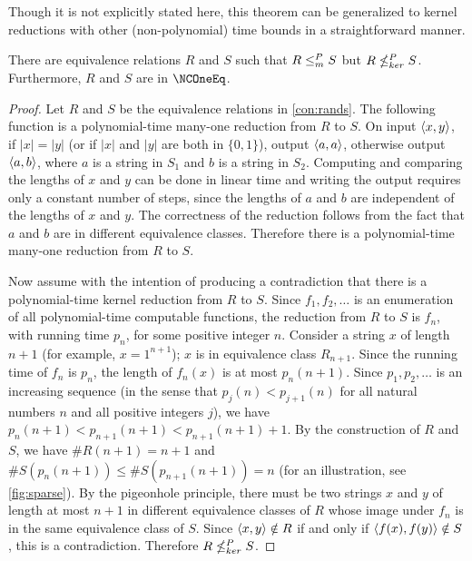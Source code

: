 Though it is not explicitly stated here, this theorem can be generalized to kernel reductions with other (non-polynomial) time bounds in a straightforward manner.

\begin{theorem}\label{thm:different}
  There are equivalence relations $R$ and $S$ such that $R \leq^{P}_{m} S$ but $R \nleq^{P}_{ker} S$.
  Furthermore, $R$ and $S$ are in $\NCOneEq$.
\end{theorem}
\begin{proof}
  Let $R$ and $S$ be the equivalence relations in \autoref{con:rands}.
  The following function is a polynomial-time many-one reduction from $R$ to $S$.
  On input $\langle x,y\rangle$, if $|x| = |y|$ (or if $|x|$ and $|y|$ are both in $\{0, 1\}$), output $\langle a,a\rangle$, otherwise output $\langle a,b\rangle$, where $a$ is a string in $S_1$ and $b$ is a string in $S_2$.
  Computing and comparing the lengths of $x$ and $y$ can be done in linear time and writing the output requires only a constant number of steps, since the lengths of $a$ and $b$ are independent of the lengths of $x$ and $y$.
  The correctness of the reduction follows from the fact that $a$ and $b$ are in different equivalence classes.
  Therefore there is a polynomial-time many-one reduction from $R$ to $S$.

  Now assume with the intention of producing a contradiction that there is a polynomial-time kernel reduction from $R$ to $S$.
  Since $f_1, f_2, \dotsc$ is an enumeration of all polynomial-time computable functions, the reduction from $R$ to $S$ is $f_n$, with running time $p_n$, for some positive integer $n$.
  Consider a string $x$ of length $n + 1$ (for example, $x = 1^{n + 1}$); $x$ is in equivalence class $R_{n + 1}$.
  Since the running time of $f_n$ is $p_n$, the length of $f_n(x)$ is at most $p_n(n + 1)$.
  Since $p_1, p_2, \dotsc$ is an increasing sequence (in the sense that $p_j(n) < p_{j + 1}(n)$ for all natural numbers $n$ and all positive integers $j$), we have $p_n(n + 1) < p_{n + 1}(n + 1) < p_{n + 1}(n + 1) + 1$.
  By the construction of $R$ and $S$, we have $\#R(n + 1) = n + 1$ and $\#S(p_n(n + 1)) \leq \#S(p_{n + 1}(n + 1)) = n$ (for an illustration, see \autoref{fig:sparse}).
  By the pigeonhole principle, there must be two strings $x$ and $y$ of length at most $n + 1$ in different equivalence classes of $R$ whose image under $f_n$ is in the same equivalence class of $S$.
  Since $\langle x,y\rangle \notin R$ if and only if $\langle f(x),f(y)\rangle \notin S$, this is a contradiction.
  Therefore $R \nleq^{P}_{ker} S$.


\end{proof}
